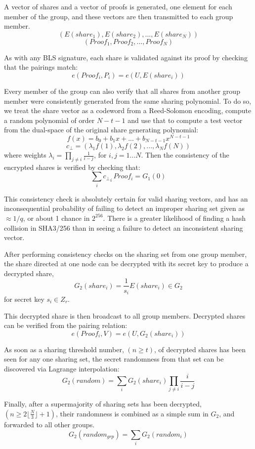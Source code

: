 \documentclass{yellowpaper}
\begin{document}
A vector of shares and a vector of proofs is generated, one element for each member of the group, and these vectors are then transmitted to each group member.
$$(E(share_1), E(share_2), ..., E(share_N))$$
$$ (Proof_1, Proof_2, ..., Proof_N)$$

As with any BLS signature, each share is validated against its proof by checking that the pairings match:
$$ e(Proof_i, P_i) = e(U, E(share_i))$$

Every member of the group can also verify that all shares from another group member were consistently generated from the same sharing polynomial. To do so, we treat the share vector as a codeword from a Reed-Solomon encoding\cite{scrape}, compute a random polynomial of order $N - t - 1$ and use that to compute a test vector from the dual-space of the original share generating polynomial:
$$f(x) = b_0 + b_1 x + ... + b_{N-t-1} x^{N-t-1}$$
$$c_{\perp} = (\lambda_1 f(1), \lambda_2 f(2), ... , \lambda_N f(N))$$
where weights $\lambda_i = \prod_{j \ne i} \frac{1}{i-j}$, for $ i,j = 1...N$.
Then the consistency of the encrypted shares is verified by checking that:
$$\sum_i {c_{\perp}}_i \, Proof_i = G_1(0)$$

This consistency check is absolutely certain for valid sharing vectors, and has an inconsequential probability of failing to detect an improper sharing set given as $\approx 1/q$, or about 1 chance in $2^{256}$. There is a greater likelihood of finding a hash collision in SHA3/256 than in seeing a failure to detect an inconsistent sharing vector.

After performing consistency checks on the sharing set from one group member, the share directed at one node can be decrypted with its secret key to produce a decrypted share, $$G_2(share_i) = \frac{1}{s_i}E(share_i) \in G_2$$ for secret key $s_i \in Z_r$.

This decrypted share is then broadcast to all group members. Decrypted shares can be verified from the pairing relation:
$$ e(Proof_i, V) = e(U, G_2(share_i))$$

As soon as a sharing threshold number, $(n \ge t)$, of decrypted shares has been seen for any one sharing set, the secret randomness from that set can be discovered via Lagrange interpolation:
$$G_2(random) = \sum_i G_2(share_i) \prod_{j \ne i} \frac{i}{i-j}$$

Finally, after a supermajority of sharing sets has been decrypted, $(n \ge 2 \lfloor \frac{N}{3} \rfloor + 1)$, their randomness is combined as a simple sum in $G_2$, and forwarded to all other groups.
$$G_2(random_{grp}) = \sum_i G_2(random_i)$$
\end{document}
